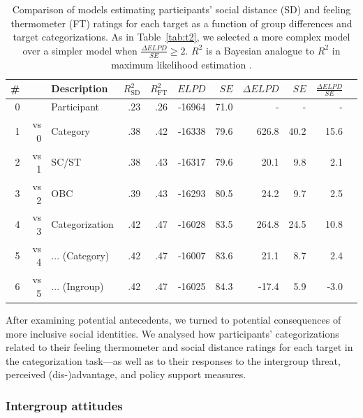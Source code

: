 \documentclass[12pt, a4paper]{article}
\begin{document}
\begin{table}[t!]
\caption{Comparison of models estimating participants' social distance (SD) and feeling thermometer (FT) ratings for each target as a function of group differences and target categorizations. As in Table~\ref{tab:t2}, we selected a more complex model over a simpler model when $\frac{\Delta\textit{ELPD}}{\textit{SE}} \geq 2$. $R^2$ is a Bayesian analogue to $R^2$ in maximum likelihood estimation \protect{}.}
\centering
{}
\small	
\begin{tabularx}{\linewidth}{r@{~}rXrrrrrrrr} \toprule
\# &  & Description & $R^2_\text{SD}$ & $R^2_\text{FT}$ & $\textit{ELPD}$ & $\textit{SE}$ & $\Delta\textit{ELPD}$ & $\textit{SE}$ & $\frac{\Delta\textit{ELPD}}{\textit{SE}}$ \\ \midrule 
0 &      & Participant & .23 & .26 & -16964 & 71.0 & - & - & - \\
1 & vs 0 & Category & .38 & .42 & -16338 & 79.6 & 626.8 & 40.2 & 15.6 \\
2 & vs 1 & SC/ST    & .38 & .43 & -16317 & 79.6 &  20.1 &  9.8 &  2.1 \\
3 & vs 2 & OBC      & .39 & .43 & -16293 & 80.5 &  24.2 &  9.7 &  2.5 \\ \midrule
4 & vs 3 & Categorization    & .42 & .47 & -16028 & 83.5 & 264.8 & 24.5 & 10.8 \\
5 & vs 4 & ... (Category) & .42 & .47 & -16007 & 83.6 &  21.1 &  8.7 &  2.4 \\
6 & vs 5 & ... (Ingroup)  & .42 & .47 & -16025 & 84.3 & -17.4 &  5.9 & -3.0 \\
\bottomrule    
\end{tabularx}
\label{tab:t3}
\end{table}

After examining potential antecedents, we turned to potential consequences of more inclusive social identities. We analysed how participants' categorizations related to their feeling thermometer and social distance ratings for each target in the categorization task---as well as to their responses to the intergroup threat, perceived (dis-)advantage, and policy support measures. 

\subsubsection{Intergroup attitudes}
\end{document}
